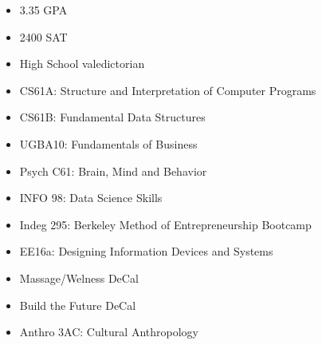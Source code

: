 \documentclass[10pt,a4paper,ragged2e]{altacv}
\begin{document}
\begin{itemize}
\item 3.35 GPA 
\smallskip
\item 2400 SAT
\smallskip
\item High School valedictorian
\smallskip
\item CS61A: Structure and Interpretation of Computer Programs
\smallskip
\item CS61B: Fundamental Data Structures
\smallskip
\item UGBA10: Fundamentals of Business
\smallskip
\item Psych C61: Brain, Mind and Behavior
\smallskip
\item INFO 98: Data Science Skills
\smallskip
\item Indeg 295: Berkeley Method of Entrepreneurship Bootcamp
\smallskip
\item EE16a: Designing Information Devices and Systems
\smallskip
\item Massage/Welness DeCal
\smallskip
\item Build the Future DeCal
\smallskip
\item Anthro 3AC: Cultural Anthropology
\end{itemize}


\clearpage



\nocite{*}
\end{document}
